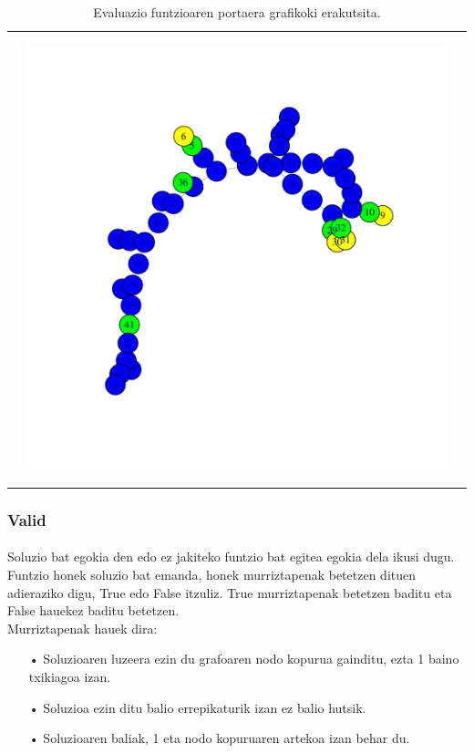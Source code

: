 \documentclass[eu,gi]{ifirak}\usepackage[]{graphicx}\usepackage[]{color}
\begin{document}
\begin{table}[hbt!]
\begin{tabular}{c c c}
\begin{center}
\end{center}
&
\begin{center}
    \includegraphics[scale=0.3]{graph5.pdf}
\end{center}
\\
\end{tabular}
\caption{Evaluazio funtzioaren portaera grafikoki erakutsita.}
\end{table}

\subsubsection{Valid}
\paragraph{}
	Soluzio bat egokia den edo ez jakiteko funtzio bat egitea egokia dela ikusi dugu. Funtzio honek soluzio bat emanda, honek murriztapenak betetzen dituen adieraziko digu, True edo False itzuliz. True murriztapenak betetzen baditu eta False hauekez baditu betetzen.\\
	Murriztapenak hauek dira:
	\begin{itemize}
	
\item[•]Soluzioaren luzeera ezin du grafoaren nodo kopurua gainditu, ezta 1 baino txikiagoa izan. 
\item[•]Soluzioa ezin ditu balio errepikaturik izan ez balio hutsik.
\item[•]Soluzioaren baliak, 1 eta nodo kopuruaren artekoa izan behar du.
\end{itemize}
\end{document}
